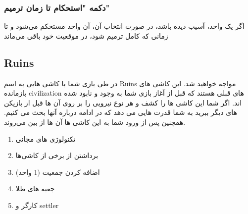 \documentclass[]{article}
\begin{document}
\subsubsection*{{\titr دکمه "استحکام تا زمان ترمیم"}}
اگر یک واحد، آسیب دیده باشد، در صورت انتخاب آن، آن واحد مستحکم می‌شود و تا زمانی که کامل ترمیم شود، در موقعیت خود باقی می‌ماند

\subsection*{{\titr Ruins}}
در طی بازی شما با کاشی هایی به اسم Ruins مواجه خواهید شد. این کاشی های بازمانده civilization های قبلی هستند که قبل از آغاز بازی شما به وجود و نابود شده اند. اگر شما این کاشی ها را کشف و هر نوع نیرویی را بر روی آن ها قبل از بازیکن های دیگر ببرید به شما قدرت هایی می دهد که در ادامه درباره آنها بحث می کنیم. همچنین پس از ورود شما به این کاشی ها آن ها از بین می‌روند.
\begin{enumerate}
	\item تکنولوژی های مجانی
	\item برداشتن  از برخی از کاشی‌ها
	\item اضافه کردن جمعیت (1 واحد)
	\item جعبه های طلا
	\item کارگر و settler
\end{enumerate}
\end{document}
